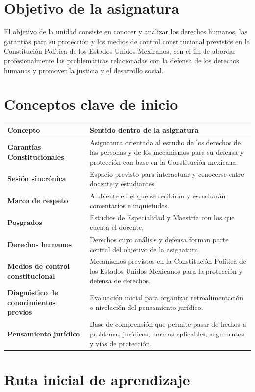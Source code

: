 \documentclass[
  spanish,
  letterpaper, oneside
]{article}
\begin{document}
\section{Objetivo de la asignatura}

El objetivo de la unidad consiste en conocer y analizar los derechos humanos, las garantías para su protección y los medios de control constitucional previstos en la Constitución Política de los Estados Unidos Mexicanos, con el fin de abordar profesionalmente las problemáticas relacionadas con la defensa de los derechos humanos y promover la justicia y el desarrollo social.

\section{Conceptos clave de inicio}

\begin{longtable}{>{\bfseries}p{}p{}}
\toprule
Concepto & Sentido dentro de la asignatura \\
\midrule
Garantías Constitucionales & Asignatura orientada al estudio de los derechos de las personas y de los mecanismos para su defensa y protección con base en la Constitución mexicana. \\
Sesión sincrónica & Espacio previsto para interactuar y conocerse entre docente y estudiantes. \\
Marco de respeto & Ambiente en el que se recibirán y escucharán comentarios e inquietudes. \\
Posgrados & Estudios de Especialidad y Maestría con los que cuenta el docente. \\
Derechos humanos & Derechos cuyo análisis y defensa forman parte central del objetivo de la asignatura. \\
Medios de control constitucional & Mecanismos previstos en la Constitución Política de los Estados Unidos Mexicanos para la protección y defensa de derechos. \\
Diagnóstico de conocimientos previos & Evaluación inicial para organizar retroalimentación o nivelación del pensamiento jurídico. \\
Pensamiento jurídico & Base de comprensión que permite pasar de hechos a problemas jurídicos, normas aplicables, argumentos y vías de protección. \\
\bottomrule
\end{longtable}

\section{Ruta inicial de aprendizaje}
\end{document}
